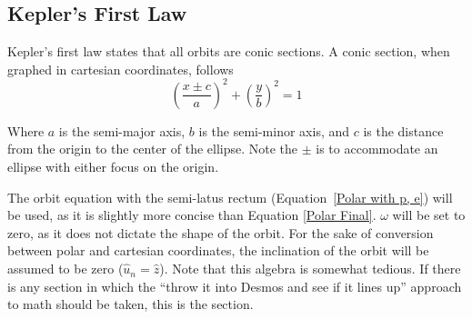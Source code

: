 \documentclass[../basicOrbitalDynamics.tex]{subfiles}
\begin{document}
\bigskip\bigskip
\subsection{Kepler's First Law}\label{sec:Kepler's First Law}

Kepler's first law states that all orbits are conic sections. A conic section, when graphed in cartesian coordinates, follows
\[\left(\frac{x\pm{}c}{a}\right)^2+\left(\frac{y}{b}\right)^2=1\]

Where $a$ is the semi-major axis, $b$ is the semi-minor axis, and $c$ is the distance from the origin to the center of the ellipse. Note the $\pm$ is to accommodate an ellipse with either focus on the origin.

The orbit equation with the semi-latus rectum (Equation~\eqref{Polar with p, e}) will be used, as it is slightly more concise than Equation \eqref{Polar Final}. $\omega$ will be set to zero, as it does not dictate the shape of the orbit. For the sake of conversion between polar and cartesian coordinates, the inclination of the orbit will be assumed to be zero ($\hat{u}_n=\hat{z}$). Note that this algebra is somewhat tedious. If there is any section in which the ``throw it into Desmos and see if it lines up'' approach to math should be taken, this is the section.
\end{document}
